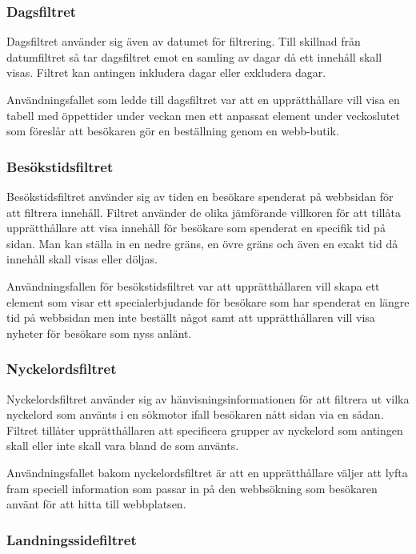 \subsubsection{Dagsfiltret}

Dagsfiltret använder sig även av datumet för filtrering. Till skillnad från datumfiltret så tar dagsfiltret emot en samling av dagar då ett innehåll skall visas. Filtret kan antingen inkludera dagar eller exkludera dagar.

Användningsfallet som ledde till dagsfiltret var att en upprätthållare vill visa en tabell med öppettider under veckan men ett anpassat element under veckoslutet som föreslår att besökaren gör en beställning genom en webb-butik.

\subsubsection{Besökstidsfiltret}

Besökstidsfiltret använder sig av tiden en besökare spenderat på webbsidan för att filtrera innehåll. Filtret använder de olika jämförande villkoren för att tillåta upprätthållare att visa innehåll för besökare som spenderat en specifik tid på sidan. Man kan ställa in en nedre gräns, en övre gräns och även en exakt tid då innehåll skall visas eller döljas.

Användningsfallen för besökstidsfiltret var att upprätthållaren vill skapa ett element som visar ett specialerbjudande för besökare som har spenderat en längre tid på webbsidan men inte beställt något samt att upprätthållaren vill visa nyheter för besökare som nyss anlänt.

\subsubsection{Nyckelordsfiltret}

Nyckelordsfiltret använder sig av hänvisningsinformationen för att filtrera ut vilka nyckelord som använts i en sökmotor ifall besökaren nått sidan via en sådan. Filtret tillåter upprätthållaren att specificera grupper av nyckelord som antingen skall eller inte skall vara bland de som använts.

Användningsfallet bakom nyckelordsfiltret är att en upprätthållare väljer att lyfta fram speciell information som passar in på den webbsökning som besökaren använt för att hitta till webbplatsen.

\subsubsection{Landningssidefiltret}

